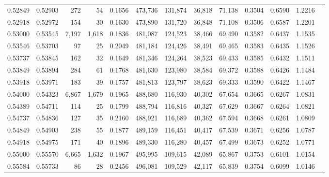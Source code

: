 \begin{tabular}{rrrrrrrrrrrrr}
0.52849 & 0.52903 &    272 &    54 &                                     0.1656 & 473,736 & 131,874 &  36,818 &  71,138 & 0.3504 & 0.6590 & 1.2216 \\
0.52918 & 0.52972 &    154 &    30 &                                     0.1630 & 473,890 & 131,720 &  36,848 &  71,108 & 0.3506 & 0.6587 & 1.2201 \\
0.53000 & 0.53545 &  7,197 & 1,618 &                                     0.1836 & 481,087 & 124,523 &  38,466 &  69,490 & 0.3582 & 0.6437 & 1.1535 \\
0.53546 & 0.53703 &     97 &    25 &                                     0.2049 & 481,184 & 124,426 &  38,491 &  69,465 & 0.3583 & 0.6435 & 1.1526 \\
0.53737 & 0.53845 &    162 &    32 &                                     0.1649 & 481,346 & 124,264 &  38,523 &  69,433 & 0.3585 & 0.6432 & 1.1511 \\
0.53849 & 0.53894 &    284 &    61 &                                     0.1768 & 481,630 & 123,980 &  38,584 &  69,372 & 0.3588 & 0.6426 & 1.1484 \\
0.53918 & 0.53971 &    183 &    39 &                                     0.1757 & 481,813 & 123,797 &  38,623 &  69,333 & 0.3590 & 0.6422 & 1.1467 \\
0.54000 & 0.54323 &  6,867 & 1,679 &                                     0.1965 & 488,680 & 116,930 &  40,302 &  67,654 & 0.3665 & 0.6267 & 1.0831 \\
0.54389 & 0.54711 &    114 &    25 &                                     0.1799 & 488,794 & 116,816 &  40,327 &  67,629 & 0.3667 & 0.6264 & 1.0821 \\
0.54737 & 0.54836 &    127 &    35 &                                     0.2160 & 488,921 & 116,689 &  40,362 &  67,594 & 0.3668 & 0.6261 & 1.0809 \\
0.54849 & 0.54903 &    238 &    55 &                                     0.1877 & 489,159 & 116,451 &  40,417 &  67,539 & 0.3671 & 0.6256 & 1.0787 \\
0.54918 & 0.54975 &    171 &    40 &                                     0.1896 & 489,330 & 116,280 &  40,457 &  67,499 & 0.3673 & 0.6252 & 1.0771 \\
0.55000 & 0.55570 &  6,665 & 1,632 &                                     0.1967 & 495,995 & 109,615 &  42,089 &  65,867 & 0.3753 & 0.6101 & 1.0154 \\
0.55584 & 0.55733 &     86 &    28 &                                     0.2456 & 496,081 & 109,529 &  42,117 &  65,839 & 0.3754 & 0.6099 & 1.0146 \\

\end{tabular}
